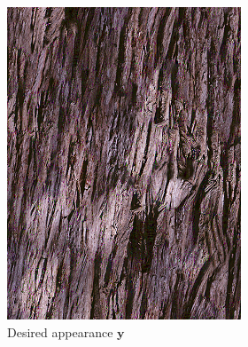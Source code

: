 \begin{figure}[]
    \begin{subfigure}{\textwidth}
        \centering
        \begin{subfigure}{0.2\textwidth}
            \centering
            \includegraphics[width=\textwidth]{images/04-experiment02/human/wood/target.jpg}
            \caption*{Desired appearance \(\bm{y}\)}
        \end{subfigure}
        \hfill
        \begin{subfigure}{0.78\textwidth}
            \centering
            \begin{subfigure}{0.32\textwidth}
                \centering
                \begin{tikzpicture}

\end{tikzpicture}
\end{subfigure}
\end{subfigure}
\end{subfigure}
\end{figure}

